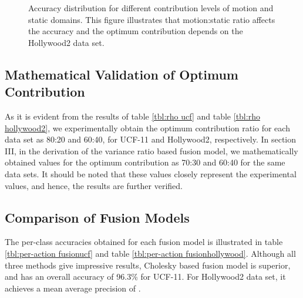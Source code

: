 \begin{figure}
\caption{Accuracy distribution for different contribution levels of motion and static domains.
This figure illustrates that motion:static ratio affects the accuracy and the optimum contribution depends on the Hollywood2 data set.}
\label{contribution chart}
\end{figure}

\subsection{Mathematical Validation of Optimum Contribution}

As it is evident from the results of table \ref{tbl:rho ucf} and table \ref{tbl:rho hollywood2}, we experimentally obtain the
optimum contribution ratio for each data set as 80:20 and 60:40, for UCF-11 and Hollywood2, respectively. In section III, in the derivation of the variance ratio based fusion model,
we mathematically obtained values for the optimum contribution as 70:30 and 60:40 for the same data sets. It should be noted that these values closely
represent the experimental values, and hence, the results are further verified.

\subsection{Comparison of Fusion Models}
The per-class accuracies obtained for each fusion model is illustrated in table \ref{tbl:per-action fusionucf} and
table \ref{tbl:per-action fusionhollywood}. Although all three methods give impressive results, Cholesky based fusion
model is superior, and has an overall accuracy of 96.3\% for UCF-11. For Hollywood2 data set, it achieves a mean average precision
of .


